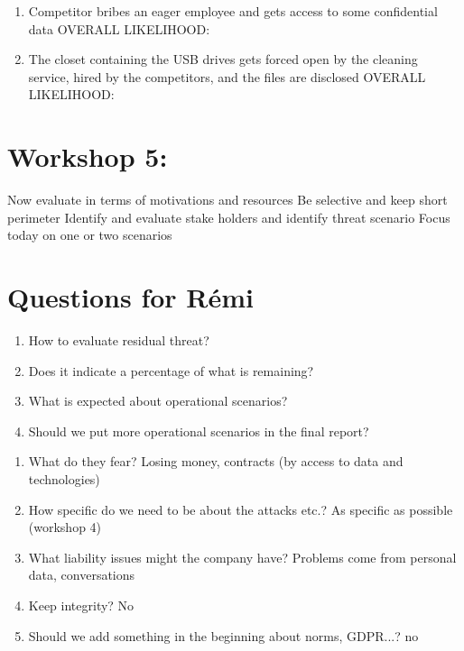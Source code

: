 \begin{enumerate}
\tightlist
\item
  Competitor bribes an eager employee and gets access to some
  confidential data OVERALL LIKELIHOOD:
\item
  The closet containing the USB drives gets forced open by the cleaning
  service, hired by the competitors, and the files are disclosed OVERALL
  LIKELIHOOD:
\end{enumerate}

\hypertarget{Workshopux205:}{%
\section{Workshop 5:}\label{Workshopux205:}}

Now evaluate in terms of motivations and resources Be selective and keep
short perimeter Identify and evaluate stake holders and identify threat
scenario Focus today on one or two scenarios

\hypertarget{Questionsux20forux20Ruxe9mi}{%
\section{Questions for Rémi}\label{Questionsux20forux20Ruxe9mi}}

\begin{enumerate}
\tightlist
\item
  How to evaluate residual threat?
\item
  Does it indicate a percentage of what is remaining?
\item
  What is expected about operational scenarios?
\item
  Should we put more operational scenarios in the final report?
\end{enumerate}

\begin{enumerate}
\tightlist
\item
  What do they fear? Losing money, contracts (by access to data and
  technologies)
\item
  How specific do we need to be about the attacks etc.? As specific as
  possible (workshop 4)
\item
  What liability issues might the company have? Problems come from
  personal data, conversations
\item
  Keep integrity? No
\item
  Should we add something in the beginning about norms, GDPR...? no
\end{enumerate}

